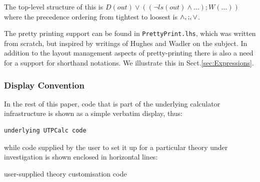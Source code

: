 \noindent
The top-level structure of this is
$D(out) \lor ( (\lnot ls(out) \land \dots) ; W(\dots) )$
where the precedence ordering from tightest to loosest is $\land,\mathrel{;},\lor$.

\noindent
The pretty printing support can be found in \texttt{PrettyPrint.lhs},
which was written from scratch, but inspired by writings of
Hughes\cite{HughesJohn1995c} and Wadler\cite{wadler-pp}
on the subject.
In addition to the layout management aspects of pretty-printing
there is also a need for a support for shorthand notations.
We illustrate this in Sect.\ref{sec:Expressions}.


%

\subsubsection{Display Convention}

In the rest of this paper, code that is part of the underlying
calculator infrastructure is shown as a simple verbatim display, thus:
\begin{verbatim}
underlying UTPCalc code
\end{verbatim}
while code supplied by the user to set it up for a particular
theory under investigation is shown enclosed in horizontal lines:
\begin{code}
user-supplied theory customisation code
\end{code}
